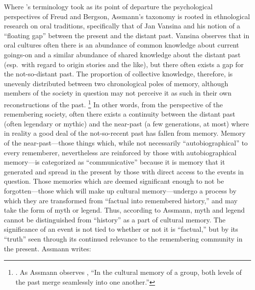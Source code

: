 Where \halbwachs's terminology took as its point of departure the psychological perspectives of Freud\autocite{terdiman_radstone-schwarz2011} and Bergson\autocite{ansellpearson_radstone-schwarz2011}, Assmann's taxonomy is rooted in ethnological research on oral traditions, specifically that of Jan Vansina and his notion of a ``floating gap'' between the present and the distant past.\autocite{vansina1985} Vansina observes that in oral cultures often there is an abundance of common knowledge about current goings-on and a similar abundance of shared knowledge about the distant past (esp.~with regard to origin stories and the like), but there often exists a gap for the not-so-distant past. The proportion of collective knowledge, therefore, is unevenly distributed between two chronological poles of memory, although members of the society in question may not perceive it as such in their own reconstructions of the past.%
%
\footnote{\cite[23--24]{vansina1985}. As Assmann observes \autocite[35]{assmann2011}, ``In the cultural memory of a group, both levels of the past merge seamlessly into one another.''}
%
In other words, from the perspective of the remembering society, often there exists a continuity between the distant past (often legendary or mythic) and the near-past (a few generations, at most) where in reality a good deal of the not-so-recent past has fallen from memory. Memory of the near-past---those things which, while not necessarily ``autobiographical'' to every rememberer, nevertheless are reinforced by those with autobiographical memory---is categorized as ``communicative'' because it is memory that it generated and spread in the present by those with direct access to the events in question. Those memories which are deemed significant enough to not be forgotten---those which will make up cultural memory---undergo a process by which they are transformed from ``factual into remembered history,'' and may take the form of myth or legend.\autocite[37--38]{assmann2011} Thus, according to Assmann, myth and legend cannot be distinguished from ``history'' as a part of cultural memory. The significance of an event is not tied to whether or not it is ``factual,'' but by its ``truth'' seen through its continued relevance to the remembering community in the present.\autocite[Paul Veyne offers a particularly stimulating discussion of the perception of the past and its relationship to myth. He concludes his book with the insightful quote, ``The theme of this book was very simple. Merely by reading the title, anyone with the slightest historical background would immediately have answered, `but of course they believed in their myths!' We have simply wanted also to make clear that what is true of `them' is also true of ourselves and to bring out the implications of this primary truth.''][128--129]{veyne1988} Assmann writes:  

